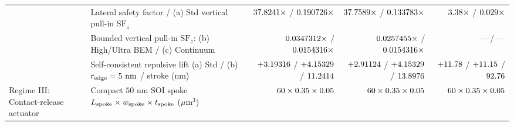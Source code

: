 \begin{table}[!htbp]
{\begin{tabular}{llrrr}
 & Lateral safety factor / (a) Std vertical pull-in $\text{SF}_z$ & $37.8241{}\times$ / $0.190726{}\times$ & $37.7589{}\times$ / $0.133783{}\times$ & $\roundtwo{\NatureFthreeOneoneoneRegtwoLateralStabilitySafetyFactor}\times$ / $\roundthree{\NatureFthreeOneoneoneRegtwoVerticalPullInSafetyFactor}\times$ \\
 & Bounded vertical pull-in $\text{SF}_z$: (b) High/Ultra BEM / (c) Continuum & $0.0347312{}\times$ / $0.0154316{}\times$ & $0.0257455{}\times$ / $0.0154316{}\times$ & --- / --- \\
 & Self-consistent repulsive lift (a) Std / (b) $r_{\rm edge}=5\text{ nm}$ / stroke (nm) & $+3.19316{}$ / $+4.15329{}$ / $11.2414{}$ & $+2.91124{}$ / $+4.15329{}$ / $13.8976{}$ & $+\roundtwo{\NatureFthreeOneoneoneRegtwoSelfConsistentBasinRepulsiveLiftNm}$ / $+\roundtwo{\NatureFthreeOneoneoneRegtwoRfivenmBasinLiftNm}$ / $\roundtwo{\NatureFthreeOneoneoneRegtwoPeakToPeakLinearStrokeNm}$ \\
\midrule
\multirow{6}{*}{Regime III: Contact-release actuator} 
 & Compact $50\text{ nm}$ SOI spoke $L_{\rm spoke} \times w_{\rm spoke} \times t_{\rm spoke}$ ($\mu$m$^3$) & $60{} \times 0.35{} \times 0.05{}$ & $60{} \times 0.35{} \times 0.05{}$ & $60{} \times 0.35{} \times 0.05{}$ \\

\end{tabular}}
\end{table}
